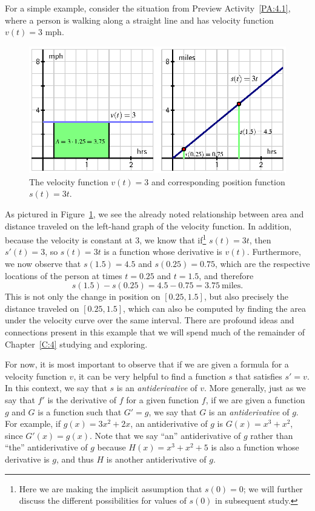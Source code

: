 For a simple example, consider the situation from Preview Activity~\ref{PA:4.1}, where a person is walking along a straight line and has velocity function $v(t) = 3$ mph.
\begin{figure}[h]
\begin{center}
\includegraphics{figures/4_1_PA1Soln.eps}
\caption{The velocity function $v(t) = 3$ and corresponding position function $s(t) = 3t$.} \label{F:4.1.PA1Soln}
\end{center}
\end{figure}
As pictured in Figure~\ref{F:4.1.PA1Soln}, we see the already noted relationship between area and distance traveled on the left-hand graph of the velocity function.  In addition, because the velocity is constant at 3, we know that if\footnote{Here we are making the implicit assumption that $s(0) = 0$; we will further discuss the different possibilities for values of $s(0)$ in subsequent study.} $s(t) = 3t$, then $s'(t) = 3$, so $s(t) = 3t$ is a function whose derivative is $v(t)$.  Furthermore, we now observe that $s(1.5) = 4.5$ and $s(0.25) = 0.75$, which are the respective locations of the person at times $t = 0.25$ and $t = 1.5$, and therefore
$$s(1.5) - s(0.25) = 4.5 - 0.75 = 3.75 \ \mbox{miles}.$$
This is not only the change in position on $[0.25,1.5]$, but also precisely the distance traveled on $[0.25,1.5]$, which can also be computed by finding the area under the velocity curve over the same interval.  There are profound ideas and connections present in this example that we will spend much of the remainder of Chapter~\ref{C:4} studying and exploring.

For now, it is most important to observe that if we are given a formula for a velocity function $v$, it can be very helpful to find a function $s$ that satisfies $s' = v$.  In this context, we say that $s$ is an \emph{antiderivative} of $v$.  More generally, just as we say that $f'$ is the derivative of $f$ for a given function $f$, if we are given a function $g$ and $G$ is a function such that $G' = g$, we say that $G$ is an \emph{antiderivative}  of $g$.  For example, if $g(x) = 3x^2 + 2x$, an antiderivative of $g$ is $G(x) = x^3 + x^2$, since $G'(x) = g(x)$.  Note that we say ``an'' antiderivative of $g$ rather than ``the'' antiderivative of $g$ because $H(x) = x^3 + x^2 + 5$ is also a function whose derivative is $g$, and thus $H$ is another antiderivative of $g$.  


